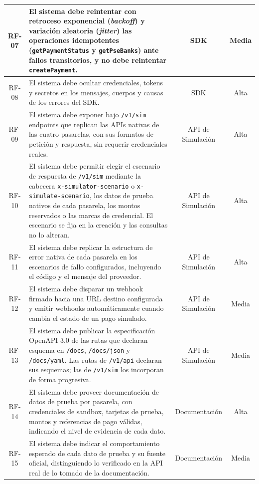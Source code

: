 \begin{center}
\begin{longtable}{|c|p{8.1cm}|c|c|}
  \hline
  RF-07 & El sistema debe reintentar con retroceso exponencial (\textit{backoff}) y variación aleatoria (\textit{jitter}) las operaciones idempotentes (\texttt{getPaymentStatus} y \texttt{getPseBanks}) ante fallos transitorios, y no debe reintentar \texttt{createPayment}. & SDK & Media \\
  \hline
  RF-08 & El sistema debe ocultar credenciales, tokens y secretos en los mensajes, cuerpos y causas de los errores del SDK. & SDK & Alta \\
  \hline
  RF-09 & El sistema debe exponer bajo \texttt{/v1/sim} endpoints que replican las APIs nativas de las cuatro pasarelas, con sus formatos de petición y respuesta, sin requerir credenciales reales. & API de Simulación & Alta \\
  \hline
  RF-10 & El sistema debe permitir elegir el escenario de respuesta de \texttt{/v1/sim} mediante la cabecera \texttt{x-simulator-scenario} o \texttt{x-simulate-scenario}, los datos de prueba nativos de cada pasarela, los montos reservados o las marcas de credencial. El escenario se fija en la creación y las consultas no lo alteran. & API de Simulación & Alta \\
  \hline
  RF-11 & El sistema debe replicar la estructura de error nativa de cada pasarela en los escenarios de fallo configurados, incluyendo el código y el mensaje del proveedor. & API de Simulación & Alta \\
  \hline
  RF-12 & El sistema debe disparar un webhook firmado hacia una URL destino configurada y emitir webhooks automáticamente cuando cambia el estado de un pago simulado. & API de Simulación & Media \\
  \hline
  RF-13 & El sistema debe publicar la especificación OpenAPI 3.0 de las rutas que declaran esquema en \texttt{/docs}, \texttt{/docs/json} y \texttt{/docs/yaml}. Las rutas de \texttt{/v1/api} declaran sus esquemas; las de \texttt{/v1/sim} los incorporan de forma progresiva. & API de Simulación & Media \\
  \hline
  RF-14 & El sistema debe proveer documentación de datos de prueba por pasarela, con credenciales de sandbox, tarjetas de prueba, montos y referencias de pago válidas, indicando el nivel de evidencia de cada dato. & Documentación & Alta \\
  \hline
  RF-15 & El sistema debe indicar el comportamiento esperado de cada dato de prueba y su fuente oficial, distinguiendo lo verificado en la API real de lo tomado de la documentación. & Documentación & Media \\

\end{longtable}
\end{center}

